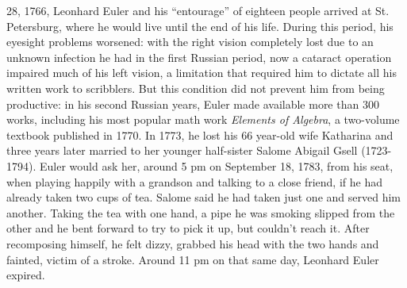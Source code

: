 28, 1766, Leonhard Euler and his ``entourage'' of eighteen people arrived at St. Petersburg, where he would live until the end of his life. During this period, his eyesight problems worsened: with the right vision completely lost due to an unknown infection he had in the first Russian period, now a cataract operation impaired much of his left vision, a limitation that required him to dictate all his written work to scribblers. But this condition did not prevent him from being productive: in his second Russian years, Euler made available more than 300 works, including his most popular math work \emph{Elements of Algebra}, a two-volume textbook published in 1770. In 1773, he lost his 66 year-old wife Katharina and three years later married to her younger half-sister Salome Abigail Gsell (1723-1794). Euler would ask her, around 5 pm on September 18, 1783, from his seat, when playing happily with a grandson and talking to a close friend, if he had already taken two cups of tea. Salome said he had taken just one and served him another. Taking the tea with one hand, a pipe he was smoking slipped from the other and he bent forward to try to pick it up, but couldn't reach it. After recomposing himself, he felt dizzy, grabbed his head with the two hands and fainted, victim of a stroke. Around 11 pm on that same day, Leonhard Euler expired.  

